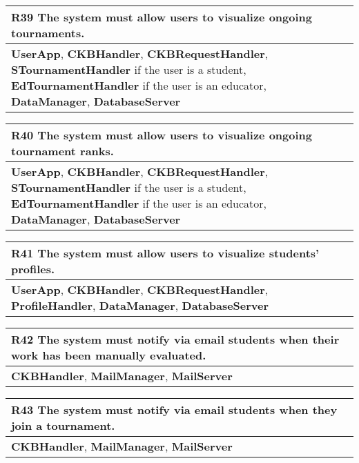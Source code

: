 \begin{table}[H]
    \begin{tabularx}{\textwidth}{X}
        \toprule
        \textbf{R39} The system must allow users to visualize ongoing tournaments. \\ \midrule
        \textbf{UserApp}, \textbf{CKBHandler}, \textbf{CKBRequestHandler}, \textbf{STournamentHandler} if the user is a student, \textbf{EdTournamentHandler} if the user is an educator, \textbf{DataManager}, \textbf{DatabaseServer}                    \\
    \end{tabularx}
\end{table}

\begin{table}[H]
    \begin{tabularx}{\textwidth}{X}
        \toprule
        \textbf{R40} The system must allow users to visualize ongoing tournament ranks. \\ \midrule
        \textbf{UserApp}, \textbf{CKBHandler}, \textbf{CKBRequestHandler}, \textbf{STournamentHandler} if the user is a student, \textbf{EdTournamentHandler} if the user is an educator, \textbf{DataManager}, \textbf{DatabaseServer}                      \\
    \end{tabularx}
\end{table}

\begin{table}[H]
    \begin{tabularx}{\textwidth}{X}
        \toprule
        \textbf{R41} The system must allow users to visualize students' profiles.  \\ \midrule
        \textbf{UserApp}, \textbf{CKBHandler}, \textbf{CKBRequestHandler}, \textbf{ProfileHandler}, \textbf{DataManager}, \textbf{DatabaseServer}                    \\
    \end{tabularx}
\end{table}

\begin{table}[H]
    \begin{tabularx}{\textwidth}{X}
        \toprule
        \textbf{R42} The system must notify via email students when their work has been manually evaluated. \\ \midrule
        \textbf{CKBHandler}, \textbf{MailManager}, \textbf{MailServer} \\    
    \end{tabularx}
\end{table}

\begin{table}[H]
    \begin{tabularx}{\textwidth}{X}
        \toprule
        \textbf{R43} The system must notify via email students when they join a tournament. \\  \midrule
        \textbf{CKBHandler}, \textbf{MailManager}, \textbf{MailServer} \\    
    \end{tabularx}
\end{table}